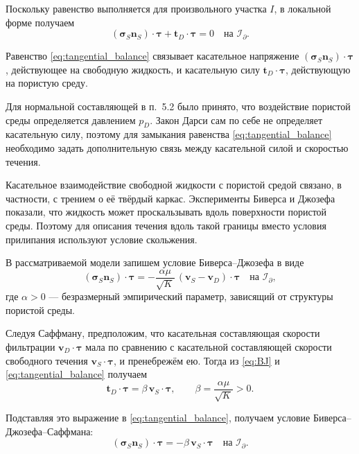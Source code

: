 \documentclass[a4paper,14pt]{extarticle}
\begin{document}
Поскольку равенство выполняется для произвольного участка
$I$, в локальной форме получаем
\begin{equation}
	(\boldsymbol\sigma_S\mathbf n_S)
	\cdot\boldsymbol\tau
	+
	\mathbf t_D\cdot\boldsymbol\tau
	=
	0
	\quad\text{на }\mathcal I_\partial.
	\label{eq:tangential_balance}
\end{equation}

Равенство \eqref{eq:tangential_balance} связывает касательное
напряжение $(\boldsymbol\sigma_S\mathbf n_S)
\cdot\boldsymbol\tau$, действующее на свободную жидкость,
и касательную силу $\mathbf t_D\cdot\boldsymbol\tau$,
действующую на пористую среду.

Для нормальной составляющей в п.~5.2 было принято, что
воздействие пористой среды определяется давлением $p_D$.
Закон Дарси сам по себе не определяет касательную силу,
поэтому для замыкания равенства
\eqref{eq:tangential_balance} необходимо задать
дополнительную связь между касательной силой и скоростью
течения.

Касательное взаимодействие свободной жидкости с пористой
средой связано, в частности, с трением о её твёрдый каркас.
Эксперименты Биверса и Джозефа показали, что жидкость может
проскальзывать вдоль поверхности пористой среды. Поэтому
для описания течения вдоль такой границы вместо условия
прилипания используют условие скольжения.

В рассматриваемой модели запишем условие
Биверса--Джозефа в виде
\begin{equation}
	(\boldsymbol\sigma_S\mathbf n_S)
	\cdot\boldsymbol\tau
	=
	-\frac{\alpha\mu}{\sqrt{K}}\,
	(\mathbf v_S-\mathbf v_D)\cdot\boldsymbol\tau
	\quad\text{на }\mathcal I_\partial,
	\label{eq:BJ}
\end{equation}
где $\alpha>0$ --- безразмерный эмпирический параметр,
зависящий от структуры пористой среды.

Следуя Саффману, предположим, что касательная составляющая
скорости фильтрации $\mathbf v_D\cdot\boldsymbol\tau$ мала
по сравнению с касательной составляющей скорости свободного
течения $\mathbf v_S\cdot\boldsymbol\tau$, и пренебрежём ею.
Тогда из \eqref{eq:BJ} и \eqref{eq:tangential_balance}
получаем
\begin{equation}
	\mathbf t_D\cdot\boldsymbol\tau
	=
	\beta\,\mathbf v_S\cdot\boldsymbol\tau,
	\qquad
	\beta=\frac{\alpha\mu}{\sqrt{K}}>0.
	\label{eq:friction_force}
\end{equation}

Подставляя это выражение в
\eqref{eq:tangential_balance}, получаем условие
Биверса--Джозефа--Саффмана:
\begin{equation}
	(\boldsymbol\sigma_S\mathbf n_S)
	\cdot\boldsymbol\tau
	=
	-\beta\,\mathbf v_S\cdot\boldsymbol\tau
	\quad\text{на }\mathcal I_\partial.
	\label{eq:BJS}
\end{equation}
\end{document}

